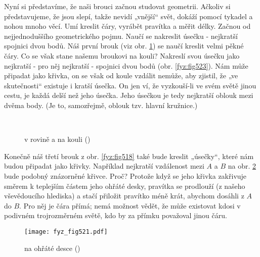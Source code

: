     Nyní si představíme, že naši brouci začnou studovat geometrii. Ačkoliv si představujeme, že 
    jsou slepí, takže nevidí „vnější“ svět, dokáží pomocí tykadel a nohou mnoho věcí. Umí kreslit 
    čáry, vyrábět pravítka a měřit délky. Začnou od nejjednoduššího geometrického pojmu. Naučí se 
    nakreslit úsečku - nejkratší spojnici dvou bodů. Náš první brouk (viz obr. \ref{fyz:fig519}) se 
    naučí kreslit velmi pěkné čáry. Co se však stane našemu broukovi na kouli? Nakreslí svou úsečku 
    jako nejkratší - pro něj nejkratší - spojnici dvou bodů (obr. \ref{fyz:fig523}). Nám může 
    připadat jako křivka, on  se však od koule vzdálit nemůže, aby zjistil, že „ve skutečnosti“ 
    existuje i kratší úsečka. On jen ví, že vyzkouší-li ve svém světě jinou cestu, je každá delší 
    než jeho úsečka. Jeho úsečkou je tedy nejkratší oblouk mezi dvěma body. (Je to, samozřejmě, 
    oblouk tzv. hlavní kružnice.)

    \begin{figure}[ht!] %
      \centering  
          \\
      \caption{ v rovině a na kouli (\cite[s.~776]{Feynman02})}
      \label{fyz:fig519}
    \end{figure}  
    
    Konečně náš třetí brouk z obr. \ref{fyz:fig518} také bude kreslit „úsečky“, které nám budou 
    připadat jako křivky. Například nejkratší vzdálenost mezi \(A\) a \(B\) na obr. 
    \ref{fyz:fig521} bude podobný znázorněné křivce. Proč? Protože když se jeho křivka zakřivuje 
    směrem k teplejším částem jeho ohřáté desky, pravítka se prodlouží (z našeho vševědoucího 
    hlediska) a stačí přiložit pravítko méně krát, abychom dosáhli z \(A\) do \(B\). Pro něj je 
    čára přímá; nemá možnost vědět, že může existovat kdosi v podivném trojrozměrném světě, kdo by 
    za přímku považoval jinou čáru.
    
    \begin{figure}[ht!] %
      \centering
      \texttt{[image: fyz\_fig521.pdf]}
      \caption{ na ohřáté desce (\cite[s.~776]{Feynman02})}
      \label{fyz:fig521}
    \end{figure}
    
